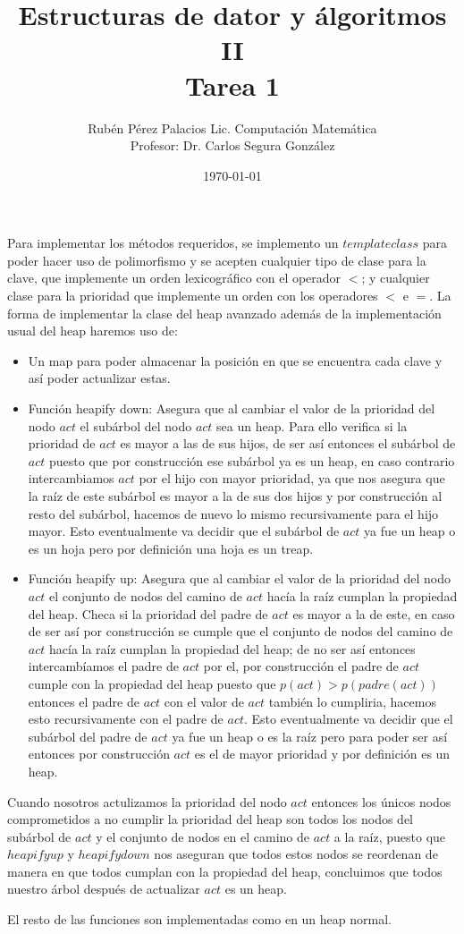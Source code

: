 \documentclass[letterpaper]{article}
\title{Estructuras de dator y álgoritmos II \\ Tarea 1}
\author{Rubén Pérez Palacios Lic. Computación Matemática\\Profesor: Dr. Carlos Segura González}
\date{\today}
\theoremstyle{definition}
\theoremstyle{lemathm}
\theoremstyle{lemathm}
\theoremstyle{lemathm}
\theoremstyle{lemademthm}
\newcommand{\1}{\mathbbm{1}}
\begin{document}
	\maketitle
	Para implementar los métodos requeridos, se implemento un $template class$ para poder hacer uso de polimorfismo y se acepten cualquier tipo de clase para la clave, que implemente un orden lexicográfico con el operador $<$; y cualquier clase para la prioridad que implemente un orden con los operadores $<$ e $=$. La forma de implementar la clase del heap avanzado además de la implementación usual del heap haremos uso de:

	\begin{itemize}
		\item Un map para poder almacenar la posición en que se encuentra cada clave y así poder actualizar estas.
		\item Función heapify down: Asegura que al cambiar el valor de la prioridad del nodo $act$ el subárbol del nodo $act$ sea un heap. Para ello verifica si la prioridad de $act$ es mayor a las de sus hijos, de ser así entonces el subárbol de $act$ puesto que por construcción ese subárbol ya es un heap, en caso contrario intercambiamos $act$ por el hijo con mayor prioridad, ya que nos asegura que la raíz de este subárbol es mayor a la de sus dos hijos y por construcción al resto del subárbol, hacemos de nuevo lo mismo recursivamente para el hijo mayor. Esto eventualmente va decidir que el subárbol de $act$ ya fue un heap o es un hoja pero por definición una hoja es un treap.
		\item Función heapify up: Asegura que al cambiar el valor de la prioridad del nodo $act$ el conjunto de nodos del camino de $act$ hacía la raíz cumplan la propiedad del heap. Checa si la prioridad del padre de $act$ es mayor a la de este, en caso de ser así por construcción se cumple que el conjunto de nodos del camino de $act$ hacía la raíz cumplan la propiedad del heap; de no ser así entonces intercambíamos el padre de $act$ por el, por construcción el padre de $act$ cumple con la propiedad del heap puesto que $p(act) > p(padre(act))$ entonces el padre de $act$ con el valor de $act$ también lo cumpliria, hacemos esto recursivamente con el padre de $act$. Esto eventualmente va decidir que el subárbol del padre de $act$ ya fue un heap o es la raíz pero para poder ser así entonces por construcción $act$ es el de mayor prioridad y por definición es un heap.
	\end{itemize}

	Cuando nosotros actulizamos la prioridad del nodo $act$ entonces los únicos nodos comprometidos a no cumplir la prioridad del heap son todos los nodos del subárbol de $act$ y el conjunto de nodos en el camino de $act$ a la raíz, puesto que $heapify up$ y $heapify down$ nos aseguran que todos estos nodos se reordenan de manera en que todos cumplan con la propiedad del heap, concluimos que todos nuestro árbol después de actualizar $act$ es un heap.

	El resto de las funciones son implementadas como en un heap normal.
\end{document}
